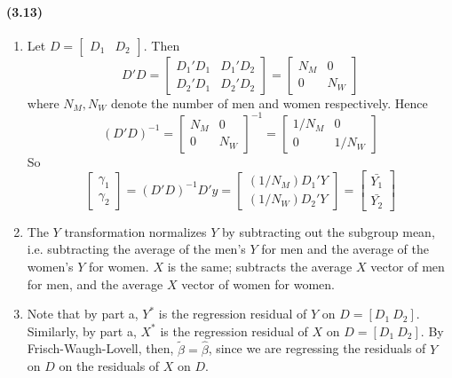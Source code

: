 \documentclass[10pt,letter]{article}
\begin{document}
\paragraph{(3.13)}
\begin{enumerate}[label=(\alph*)]
  \item Let $D = \begin{bmatrix} D_1 & D_2 \end{bmatrix}$. Then
  \[ D'D = \begin{bmatrix} D_1'D_1 & D_1'D_2 \\ D_2'D_1 & D_2'D_2 \end{bmatrix} = \begin{bmatrix} N_M & 0 \\ 0 & N_W \end{bmatrix}  \]
  where $N_M, N_W$ denote the number of men and women respectively. Hence
  \[ (D'D)^{-1} = \begin{bmatrix} N_M & 0 \\ 0 & N_W \end{bmatrix}^{-1} =  \begin{bmatrix} 1/N_M & 0 \\ 0 & 1/N_W \end{bmatrix} \]
  So
  \[ \begin{bmatrix} \gamma_1 \\ \gamma_2 \end{bmatrix} = (D'D)^{-1}D'y = \begin{bmatrix}
  (1/N_M) D_1'Y \\ (1/N_W) D_2'Y
  \end{bmatrix} =  \begin{bmatrix}
  \bar{Y_1} \\ \bar{Y_2}
  \end{bmatrix}\]
  \item The $Y$ transformation normalizes $Y$ by subtracting out the subgroup mean, i.e. subtracting the average of the men's $Y$ for men and the average of the women's $Y$ for women. $X$ is the same; subtracts the average $X$ vector of men for men, and the average $X$ vector of women for women.
  \item Note that by part a, $Y^*$ is the regression residual of $Y$ on $D= [D_1 \ D_2]$. Similarly, by part a, $X^*$ is the regression residual of $X$ on $D = [D_1 \ D_2]$. By Frisch-Waugh-Lovell, then, $\tilde{\beta} = \hat{\beta}$, since we are regressing the residuals of $Y$ on $D$ on the residuals of $X$ on $D$.
 \end{enumerate}
\end{document}
